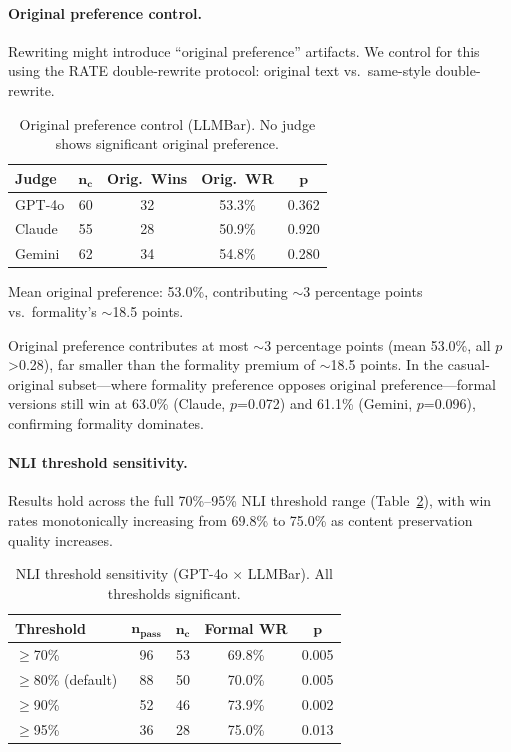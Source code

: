 \documentclass[11pt,a4paper]{article}
\begin{document}
\paragraph{Original preference control.}
Rewriting might introduce ``original preference'' artifacts.
We control for this using the RATE double-rewrite protocol: original text vs.\ same-style double-rewrite.

\begin{table}[t]
\centering
\small
\caption{Original preference control (LLMBar). No judge shows significant original preference.}
\label{tab:original}
\begin{tabular}{lcccc}
\toprule
\textbf{Judge} & $\bm{n_c}$ & \textbf{Orig.\ Wins} & \textbf{Orig.\ WR} & $\bm{p}$ \\
\midrule
GPT-4o       & 60 & 32 & 53.3\% & 0.362 \\
Claude       & 55 & 28 & 50.9\% & 0.920 \\
Gemini       & 62 & 34 & 54.8\% & 0.280 \\
\bottomrule
\end{tabular}
\begin{flushleft}
\footnotesize Mean original preference: 53.0\%, contributing $\sim$3 percentage points vs.\ formality's $\sim$18.5 points.
\end{flushleft}
\end{table}

Original preference contributes at most $\sim$3 percentage points (mean 53.0\%, all $p$>0.28), far smaller than the formality premium of $\sim$18.5 points.
In the casual-original subset---where formality preference opposes original preference---formal versions still win at 63.0\% (Claude, $p$=0.072) and 61.1\% (Gemini, $p$=0.096), confirming formality dominates.

\paragraph{NLI threshold sensitivity.}
Results hold across the full 70\%--95\% NLI threshold range (Table~\ref{tab:nli_sens}), with win rates monotonically increasing from 69.8\% to 75.0\% as content preservation quality increases.

\begin{table}[t]
\centering
\small
\caption{NLI threshold sensitivity (GPT-4o $\times$ LLMBar). All thresholds significant.}
\label{tab:nli_sens}
\begin{tabular}{lcccc}
\toprule
\textbf{Threshold} & $\bm{n_{\text{pass}}}$ & $\bm{n_c}$ & \textbf{Formal WR} & $\bm{p}$ \\
\midrule
$\geq$70\% & 96 & 53 & 69.8\% & 0.005 \\
$\geq$80\% (default) & 88 & 50 & 70.0\% & 0.005 \\
$\geq$90\% & 52 & 46 & 73.9\% & 0.002 \\
$\geq$95\% & 36 & 28 & 75.0\% & 0.013 \\
\bottomrule
\end{tabular}
\end{table}
\end{document}

